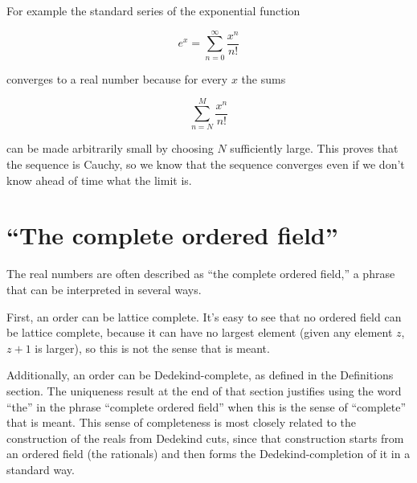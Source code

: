 \documentclass[12pt]{article}
\begin{document}
For example the standard series of the exponential function
                                                                                
$$
e^x = \sum_{n=0}^\infty \frac{x^n}{n!}
$$
                                                                                
converges to a real number because for every $x$ the sums
                                                                                
                                                                                
$$
\sum_{n=N}^M \frac{x^n}{n!}
$$
                                                                                
can be made arbitrarily small by choosing $N$ sufficiently large. This proves
that the sequence is Cauchy, so we know that the sequence converges even if we
don't know ahead of time what the limit is.
                                                                               
\section{``The complete ordered field''}

The real numbers are often described as ``the complete ordered field,'' a phrase
that can be interpreted in several ways.

First, an order can be lattice complete. It's easy to see that no ordered field
can be lattice complete, because it can have no largest element (given any
element $z$, $z + 1$ is larger), so this is not the sense that is meant.

Additionally, an order can be Dedekind-complete, as defined in the Definitions section. The uniqueness result at the end of that section justifies using the
word ``the'' in the phrase ``complete ordered field'' when this is the sense of
``complete'' that is meant. This sense of completeness is most closely related to the construction of the reals from Dedekind cuts, since that construction
starts from an ordered field (the rationals) and then forms the Dedekind-completion of it in a standard way. 
\end{document}

